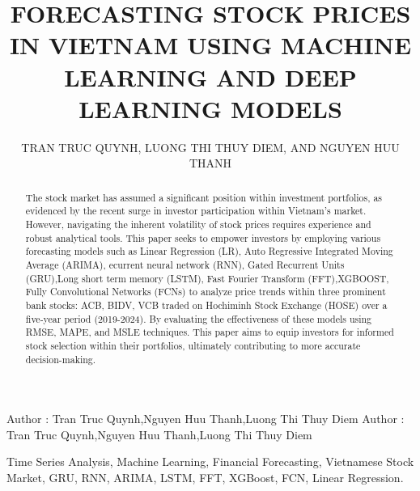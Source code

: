 \documentclass{ieeeojies}
\begin{document}
\title{FORECASTING STOCK PRICES IN VIETNAM USING MACHINE LEARNING AND DEEP LEARNING MODELS}

\author{\uppercase{Tran Truc Quynh},
\uppercase{Luong Thi Thuy Diem, and Nguyen Huu Thanh}}

\address[1]{Faculty of Information Systems, University of Information Technology, (e-mail: 21522539@gm.uit.edu.vn)}
\address[2]{Faculty of Information Systems, University of Information Technology, (e-mail: 21521953@gm.uit.edu.vn)}
\address[3]{Faculty of Information Systems, University of Information Technology, (e-mail: 21522599@gm.uit.edu.vn)}

\markboth
{Author \headeretal: Tran Truc Quynh,Nguyen Huu Thanh,Luong Thi Thuy Diem}
{Author \headeretal: Tran Truc Quynh,Nguyen Huu Thanh,Luong Thi Thuy Diem}

\begin{abstract}
The stock market has assumed a significant position within investment portfolios, as evidenced by the recent surge in investor participation within Vietnam's market. However, navigating the inherent volatility of stock prices requires experience and robust analytical tools. This paper seeks to empower investors by employing various forecasting models such as Linear Regression (LR), Auto Regressive Integrated Moving Average (ARIMA), ecurrent neural network (RNN), Gated Recurrent Units (GRU),Long short term memory (LSTM), Fast Fourier Transform (FFT),XGBOOST, Fully Convolutional Networks (FCNs) to analyze price trends within three prominent bank stocks: ACB, BIDV, VCB traded on Hochiminh Stock Exchange (HOSE) over a five-year period (2019-2024). By evaluating the effectiveness of these models using RMSE, MAPE, and MSLE techniques. This paper aims to equip investors for informed stock selection within their portfolios, ultimately contributing to more accurate decision-making.
\end{abstract}

\begin{keywords}
Time Series Analysis, Machine Learning, Financial Forecasting, Vietnamese Stock Market,
GRU, RNN, ARIMA, LSTM, FFT, XGBoost, FCN, Linear Regression.
\end{keywords}

\titlepgskip=-15pt

\maketitle
\end{document}
